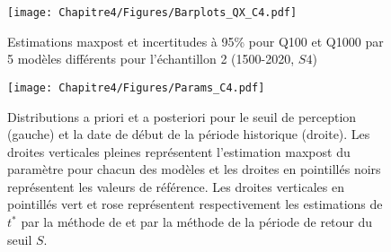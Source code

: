 	
	\begin{figure}[h]
		\centering
		\texttt{[image: Chapitre4/Figures/Barplots\_QX\_C4.pdf]}
		\caption{Estimations maxpost et incertitudes à 95\% pour Q100 et Q1000 par 5 modèles différents pour l'échantillon 2 (1500-2020, $S4$)}
		\label{fig:BarplotC4}
	\end{figure}
	
		\begin{table}[h]
	\centering
	\caption{Résultats maxpost et incertitudes de 6 modèles pour l'échantillon 2. Le modèle $D^*$ représente les résultats du modèle D avec des a priori plus informatifs (section \ref{subsec:D*}). Q100 et Q1000 représentent respectivement le débit des crues centennales et millénales, $\xi$ le paramètre de forme de la distribution GEV, $S$ le seuil de perception et $t^{*}$ la date de début de la période historique. Les écarts type des distributions a posteriori sont représentés par les colonnes débutant par la lettre "u".}
		\label{tab:ResC4}

	\end{table}
	

	\begin{figure}[h]
		\centering
		\texttt{[image: Chapitre4/Figures/Params\_C4.pdf]}	
		\caption{Distributions a priori et a posteriori pour le seuil de perception (gauche) et la date de début de la période historique (droite). Les droites verticales pleines représentent l'estimation maxpost du paramètre pour chacun des modèles et les droites en pointillés noirs représentent les valeurs de référence. Les droites verticales en pointillés vert et rose représentent respectivement les estimations de $t^{*}$ par la méthode de \citet{prosdocimi_german_2018} et par la méthode de la période de retour du seuil $S$.}
		\label{fig:Params_C4}
	\end{figure}

